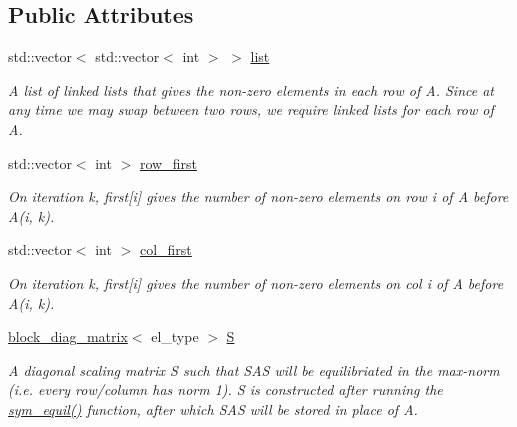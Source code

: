 \subsection*{Public Attributes}
\begin{DoxyCompactItemize}
\item 
std\+::vector$<$ std\+::vector$<$ int $>$ $>$ \hyperlink{classlilc__matrix_ad942a0e5503a2b4327a12287432fca81}{list}\hypertarget{classlilc__matrix_ad942a0e5503a2b4327a12287432fca81}{}\label{classlilc__matrix_ad942a0e5503a2b4327a12287432fca81}

\begin{DoxyCompactList}\small\item\em A list of linked lists that gives the non-\/zero elements in each row of A. Since at any time we may swap between two rows, we require linked lists for each row of A. \end{DoxyCompactList}\item 
std\+::vector$<$ int $>$ \hyperlink{classlilc__matrix_a2ca57e0c3866ed0cf1f17f6253666ebb}{row\+\_\+first}\hypertarget{classlilc__matrix_a2ca57e0c3866ed0cf1f17f6253666ebb}{}\label{classlilc__matrix_a2ca57e0c3866ed0cf1f17f6253666ebb}

\begin{DoxyCompactList}\small\item\em On iteration k, first\mbox{[}i\mbox{]} gives the number of non-\/zero elements on row i of A before A(i, k). \end{DoxyCompactList}\item 
std\+::vector$<$ int $>$ \hyperlink{classlilc__matrix_a36c12de6fccae4ac5a885e8aa60788e9}{col\+\_\+first}\hypertarget{classlilc__matrix_a36c12de6fccae4ac5a885e8aa60788e9}{}\label{classlilc__matrix_a36c12de6fccae4ac5a885e8aa60788e9}

\begin{DoxyCompactList}\small\item\em On iteration k, first\mbox{[}i\mbox{]} gives the number of non-\/zero elements on col i of A before A(i, k). \end{DoxyCompactList}\item 
\hyperlink{classblock__diag__matrix}{block\+\_\+diag\+\_\+matrix}$<$ el\+\_\+type $>$ \hyperlink{classlilc__matrix_afc4659265addfeab376ffaa8f54ed596}{S}\hypertarget{classlilc__matrix_afc4659265addfeab376ffaa8f54ed596}{}\label{classlilc__matrix_afc4659265addfeab376ffaa8f54ed596}

\begin{DoxyCompactList}\small\item\em A diagonal scaling matrix S such that S\+AS will be equilibriated in the max-\/norm (i.\+e. every row/column has norm 1). S is constructed after running the \hyperlink{classlilc__matrix_a37fc8dcc40799dfde0decaaf8bd74b51}{sym\+\_\+equil()} function, after which S\+AS will be stored in place of A. \end{DoxyCompactList}\end{DoxyCompactItemize}



